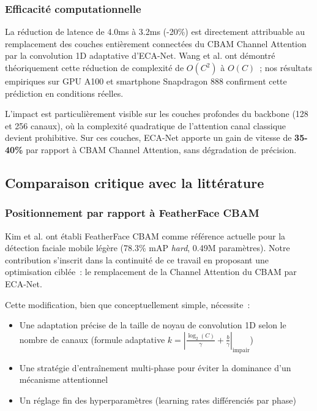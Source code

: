 \begin{onehalfspace}
\subsubsection{Efficacité computationnelle}

\hspace{0.65 cm}La réduction de latence de 4.0ms à 3.2ms (-20\%) est directement attribuable au remplacement des couches entièrement connectées du CBAM Channel Attention par la convolution 1D adaptative d'ECA-Net. Wang et al. \cite{Wang2020ECANet} ont démontré théoriquement cette réduction de complexité de $O(C^2)$ à $O(C)$~; nos résultats empiriques sur GPU A100 et smartphone Snapdragon 888 confirment cette prédiction en conditions réelles.

\hspace{0.65 cm}L'impact est particulièrement visible sur les couches profondes du backbone (128 et 256 canaux), où la complexité quadratique de l'attention canal classique devient prohibitive. Sur ces couches, ECA-Net apporte un gain de vitesse de \textbf{35-40\%} par rapport à CBAM Channel Attention, sans dégradation de précision.

\subsection{Comparaison critique avec la littérature}

\subsubsection{Positionnement par rapport à FeatherFace CBAM}

\hspace{0.65 cm}Kim et al. \cite{Kim2025FeatherFace} ont établi FeatherFace CBAM comme référence actuelle pour la détection faciale mobile légère (78.3\% mAP \textit{hard}, 0.49M paramètres). Notre contribution s'inscrit dans la continuité de ce travail en proposant une optimisation ciblée~: le remplacement de la Channel Attention du CBAM par ECA-Net.

\hspace{0.65 cm}Cette modification, bien que conceptuellement simple, nécessite~:
\begin{itemize}
\item Une adaptation précise de la taille de noyau de convolution 1D selon le nombre de canaux (formule adaptative $k = |\frac{\log_2(C)}{\gamma} + \frac{b}{\gamma}|_{\text{impair}}$)
\item Une stratégie d'entraînement multi-phase pour éviter la dominance d'un mécanisme attentionnel
\item Un réglage fin des hyperparamètres (learning rates différenciés par phase)
\end{itemize}


\end{onehalfspace}
